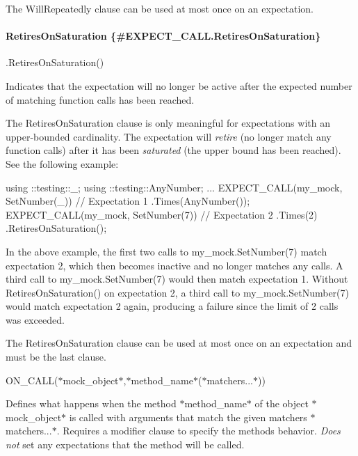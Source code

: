 The {\ttfamily Will\+Repeatedly} clause can be used at most once on an expectation.

\paragraph*{Retires\+On\+Saturation \{\#\+E\+X\+P\+E\+C\+T\+\_\+\+C\+A\+L\+L.\+Retires\+On\+Saturation\}}

{\ttfamily .Retires\+On\+Saturation()}

Indicates that the expectation will no longer be active after the expected number of matching function calls has been reached.

The {\ttfamily Retires\+On\+Saturation} clause is only meaningful for expectations with an upper-\/bounded cardinality. The expectation will {\itshape retire} (no longer match any function calls) after it has been {\itshape saturated} (the upper bound has been reached). See the following example\+:


\begin{DoxyCode}
using ::testing::\_;
using ::testing::AnyNumber;
...
EXPECT\_CALL(my\_mock, SetNumber(\_))  \textcolor{comment}{// Expectation 1}
    .Times(AnyNumber());
EXPECT\_CALL(my\_mock, SetNumber(7))  \textcolor{comment}{// Expectation 2}
    .Times(2)
    .RetiresOnSaturation();
\end{DoxyCode}


In the above example, the first two calls to {\ttfamily my\+\_\+mock.\+Set\+Number(7)} match expectation 2, which then becomes inactive and no longer matches any calls. A third call to {\ttfamily my\+\_\+mock.\+Set\+Number(7)} would then match expectation 1. Without {\ttfamily Retires\+On\+Saturation()} on expectation 2, a third call to {\ttfamily my\+\_\+mock.\+Set\+Number(7)} would match expectation 2 again, producing a failure since the limit of 2 calls was exceeded.

The {\ttfamily Retires\+On\+Saturation} clause can be used at most once on an expectation and must be the last clause.

{\ttfamily O\+N\+\_\+\+C\+A\+LL(}$\ast${\ttfamily mock\+\_\+object}$\ast${\ttfamily ,}$\ast${\ttfamily method\+\_\+name}$\ast${\ttfamily (}$\ast${\ttfamily matchers...}$\ast${\ttfamily ))}

Defines what happens when the method $\ast${\ttfamily method\+\_\+name}$\ast$ of the object $\ast${\ttfamily mock\+\_\+object}$\ast$ is called with arguments that match the given matchers $\ast${\ttfamily matchers...}$\ast$. Requires a modifier clause to specify the method\textquotesingle{}s behavior. {\itshape Does not} set any expectations that the method will be called.

